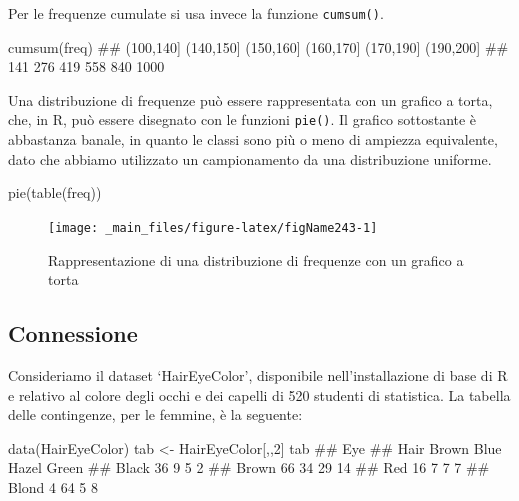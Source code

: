 \documentclass[a4paper,12pt,oneside]{book}
\newenvironment{Shaded}{\begin{snugshade}}{\end{snugshade}}
\newcommand{\DecValTok}[1]{#1}
\newcommand{\DocumentationTok}[1]{#1}
\newcommand{\OtherTok}[1]{#1}
\newcommand{\FunctionTok}[1]{#1}
\newcommand{\NormalTok}[1]{#1}
\begin{document}
Per le frequenze cumulate si usa invece la funzione \texttt{cumsum()}.

\begin{Shaded}
\begin{Highlighting}[]
\FunctionTok{cumsum}\NormalTok{(freq)}
\DocumentationTok{\#\# (100,140] (140,150] (150,160] (160,170] (170,190] (190,200] }
\DocumentationTok{\#\#       141       276       419       558       840      1000}
\end{Highlighting}
\end{Shaded}

Una distribuzione di frequenze può essere rappresentata con un grafico a torta, che, in R, può essere disegnato con le funzioni \texttt{pie()}. Il grafico sottostante è abbastanza banale, in quanto le classi sono più o meno di ampiezza equivalente, dato che abbiamo utilizzato un campionamento da una distribuzione uniforme.

\begin{Shaded}
\begin{Highlighting}[]
\FunctionTok{pie}\NormalTok{(}\FunctionTok{table}\NormalTok{(freq))}
\end{Highlighting}
\end{Shaded}

\begin{figure}

{\centering \texttt{[image: \_main\_files/figure-latex/figName243-1]} 

}

\caption{Rappresentazione di una distribuzione di frequenze con un grafico a torta}\label{fig:figName243}
\end{figure}

\hypertarget{connessione-1}{%
\subsection{Connessione}\label{connessione-1}}

Consideriamo il dataset `HairEyeColor', disponibile nell'installazione di base di R e relativo al colore degli occhi e dei capelli di 520 studenti di statistica. La tabella delle contingenze, per le femmine, è la seguente:

\begin{Shaded}
\begin{Highlighting}[]
\FunctionTok{data}\NormalTok{(HairEyeColor)}
\NormalTok{tab }\OtherTok{\textless{}{-}}\NormalTok{ HairEyeColor[,,}\DecValTok{2}\NormalTok{]}
\NormalTok{tab}
\DocumentationTok{\#\#        Eye}
\DocumentationTok{\#\# Hair    Brown Blue Hazel Green}
\DocumentationTok{\#\#   Black    36    9     5     2}
\DocumentationTok{\#\#   Brown    66   34    29    14}
\DocumentationTok{\#\#   Red      16    7     7     7}
\DocumentationTok{\#\#   Blond     4   64     5     8}
\end{Highlighting}
\end{Shaded}
\end{document}

